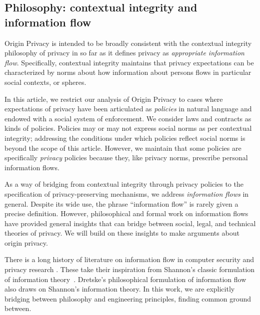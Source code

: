\documentclass[../thesis.tex]{subfiles}
\begin{document}
\subsection{Philosophy: contextual integrity and information flow}

Origin Privacy is intended to be broadly consistent
with the contextual integrity \cite{nissenbaum09book}
philosophy of privacy in so far as it defines privacy
as \emph{appropriate information flow}.
Specifically, contextual integrity maintains that
privacy expectations can be characterized by norms
about how information about persons flows in particular
social contexts, or spheres.

In this article, we restrict our analysis of Origin Privacy
to cases where expectations of privacy have been articulated
as \emph{policies} in natural language and endowed with a 
social system of enforcement.
We consider laws and contracts as kinds of policies.
Policies may or may not express social norms as per
contextual integrity; addressing the conditions under
which policies reflect social norms is beyond the scope
of this article.
However, we maintain that some policies are specifically
\emph{privacy} policies because they, like privacy norms,
prescribe personal information flows. 

As a way of bridging from contextual integrity through
privacy policies to the specification of privacy-preserving
mechanisms, we address \emph{information flows} in general.
Despite its wide use, the phrase ``information flow''
is rarely given a precise definition.
However, philosophical and formal work on information flows have
provided general insights that can bridge between social, legal,
and technical theories of privacy.
We will build on these insights to make
arguments about origin privacy.

There is a long history of literature on information flow
in computer security and privacy 
research \cite{mclean90sp,gray91sp,barthe04csf,tschantz15csf,smith15lics}.
These take their inspiration from Shannon's classic formulation 
of information theory~\cite{shannon1948mathematical}.
Dretske's philosophical
formulation of information flow~\cite{dretske1983epistemology}
also draws on Shannon's information theory.
In this work, we are explicitly bridging between philosophy and engineering
principles, finding common ground between.
\end{document}
